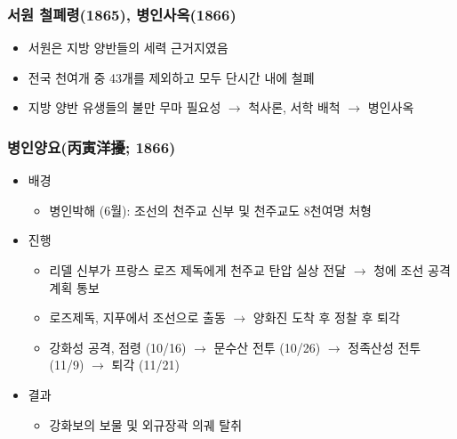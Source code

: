\subsubsection*{서원 철폐령(1865), 병인사옥(1866)}

\begin{itemize}
    \item 서원은 지방 양반들의 세력 근거지였음
    \item 전국 천여개 중 43개를 제외하고 모두 단시간 내에 철폐
    \item 지방 양반 유생들의 불만 무마 필요성 $\rightarrow$ 척사론, 서학 배척 $\rightarrow$ 병인사옥
\end{itemize}
\newpage

\subsubsection*{병인양요(丙寅洋擾; 1866)}

\begin{itemize}
    \item 배경
    \begin{itemize}
        \item 병인박해 (6월): 조선의 천주교 신부 및 천주교도 8천여명 처형
    \end{itemize}
    \item 진행
    \begin{itemize}
        \item 리델 신부가 프랑스 로즈 제독에게 천주교 탄압 실상 전달 $\rightarrow$ 청에 조선 공격 계획 통보
        \item 로즈제독, 지푸에서 조선으로 출동 $\rightarrow$ 양화진 도착 후 정찰 후 퇴각
        \item 강화성 공격, 점령 (10/16) $\rightarrow$ 문수산 전투 (10/26) $\rightarrow$ 정족산성 전투 (11/9) $\rightarrow$ 퇴각 (11/21)
    \end{itemize}
    \item 결과
    \begin{itemize}
        \item 강화보의 보물 및 외규장곽 의궤 탈취
    \end{itemize}
\end{itemize}

